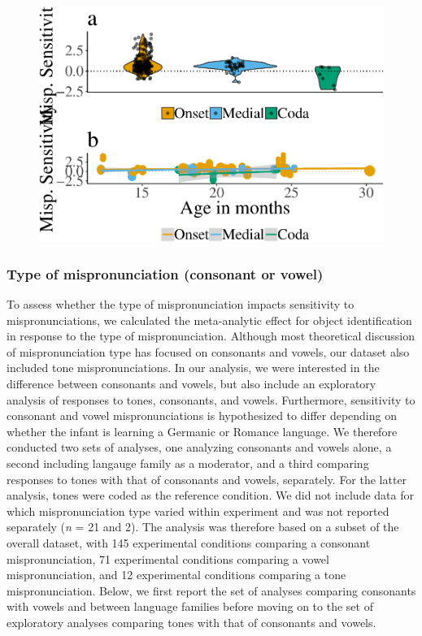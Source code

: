 \documentclass[man]{apa6}
\theoremstyle{definition}
\theoremstyle{definition}
\theoremstyle{definition}
\theoremstyle{remark}
\begin{document}
\begin{figure}
\centering
\includegraphics{VonHolzenBergmann_MPMetaAnalysis_files/figure-latex/PlotMispPosit-1.pdf}
\caption{}
\end{figure}

\subsubsection{Type of mispronunciation (consonant or
vowel)}\label{type-of-mispronunciation-consonant-or-vowel}

To assess whether the type of mispronunciation impacts sensitivity to
mispronunciations, we calculated the meta-analytic effect for object
identification in response to the type of mispronunciation. Although
most theoretical discussion of mispronunciation type has focused on
consonants and vowels, our dataset also included tone mispronunciations.
In our analysis, we were interested in the difference between consonants
and vowels, but also include an exploratory analysis of responses to
tones, consonants, and vowels. Furthermore, sensitivity to consonant and
vowel mispronunciations is hypothesized to differ depending on whether
the infant is learning a Germanic or Romance language. We therefore
conducted two sets of analyses, one analyzing consonants and vowels
alone, a second including langauge family as a moderator, and a third
comparing responses to tones with that of consonants and vowels,
separately. For the latter analysis, tones were coded as the reference
condition. We did not include data for which mispronunciation type
varied within experiment and was not reported separately (\emph{n} = 21
and 2). The analysis was therefore based on a subset of the overall
dataset, with 145 experimental conditions comparing a consonant
mispronunciation, 71 experimental conditions comparing a vowel
mispronunciation, and 12 experimental conditions comparing a tone
mispronunciation. Below, we first report the set of analyses comparing
consonants with vowels and between language families before moving on to
the set of exploratory analyses comparing tones with that of consonants
and vowels.
\end{document}

